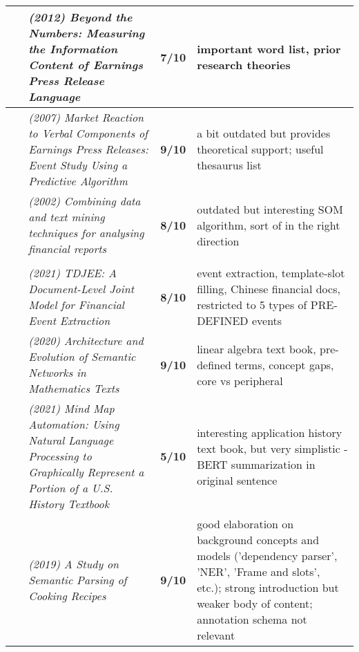 \documentclass[10pt]{article}
\begin{document}
\begin{landscape}
\begin{longtable}{ |m{2em}|m{28em}|m{3em}|m{24em}| }
~\cite{2012_beyondNumbers} & \emph{(2012) Beyond the Numbers: Measuring the Information Content of Earnings Press Release Language}
& \textbf{7/10} & important word list, prior research theories\\
 \hline

~\cite{2007_verbal_market} & \emph{(2007) Market Reaction to Verbal Components of Earnings Press Releases: Event Study Using a Predictive Algorithm}
& \textbf{9/10} & a bit outdated but provides theoretical support; useful thesaurus list\\
 \hline

~\cite{2002_textmining_finreport} & \emph{(2002) Combining data and text mining techniques for analysing financial reports}
& \textbf{8/10} & outdated but interesting SOM algorithm, sort of in the right direction\\
 \hline

\rowcolor{lightgray}\multicolumn{4}{|l|}{Extraction / Semantic Parsing} \\
 \hline 

~\cite{2021_TDJEE} & \emph{(2021) TDJEE: A Document-Level Joint Model for Financial Event Extraction}
& \textbf{8/10} & event extraction, template-slot filling, Chinese financial docs, restricted to 5 types of PRE-DEFINED events \\
 \hline

~\cite{2020_semanticNetworkMathText} & \emph{(2020) Architecture and Evolution of Semantic Networks in Mathematics Texts}
& \textbf{9/10} & linear algebra text book, pre-defined terms, concept gaps, core vs peripheral\\
 \hline

~\cite{2021_historyTextbook} & \emph{(2021) Mind Map Automation: Using Natural Language Processing to Graphically Represent a Portion of a U.S. History Textbook}
& \textbf{5/10} & interesting application history text book, but very simplistic - BERT summarization in original sentence\\
 \hline

~\cite{2019_semanticParsing_cookingRecipes} & \emph{(2019) A Study on Semantic Parsing of Cooking Recipes}
& \textbf{9/10} & good elaboration on background concepts and models ('dependency parser', 'NER', 'Frame and slots', etc.); strong introduction but weaker body of content; annotation schema not relevant\\
 \hline


\end{longtable}
\end{landscape}
\end{document}
